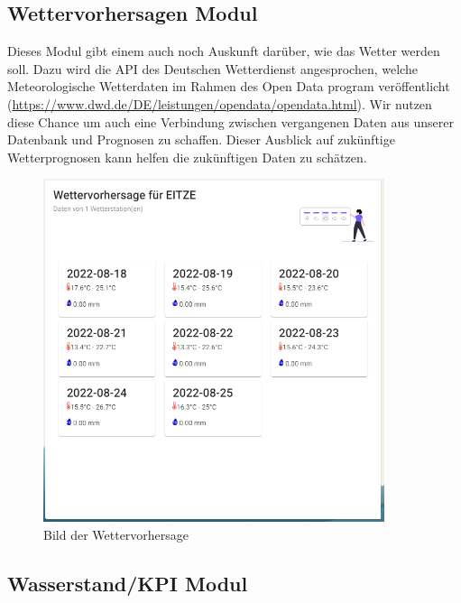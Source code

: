 \newpage
\subsection{Wettervorhersagen Modul}

Dieses Modul gibt einem auch noch Auskunft darüber, wie das Wetter werden soll. Dazu wird die API des Deutschen Wetterdienst angesprochen, welche Meteorologische Wetterdaten im Rahmen des Open Data program veröffentlicht (\url{https://www.dwd.de/DE/leistungen/opendata/opendata.html}). Wir nutzen diese Chance um auch eine Verbindung zwischen vergangenen Daten aus unserer Datenbank und Prognosen zu schaffen. Dieser Ausblick auf zukünftige Wetterprognosen kann helfen die zukünftigen Daten zu schätzen.

\begin{figure}[!htb]
 \centering
 \includegraphics[width=10cm]{figures/Wettervorher.PNG}
 \caption{Bild der Wettervorhersage}
 \label{fig:Bild der Wettervorhersage}
\end{figure}
\newpage
\subsection{Wasserstand/KPI Modul}

